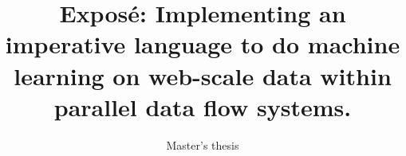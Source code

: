 \documentclass{dima}
\begin{document}

\title{Exposé: Implementing an imperative language to do machine learning on web-scale data within parallel data flow systems.}
\subtitle{Master's thesis}


%
%
%
%


\author{
%
%
}
\end{document}
